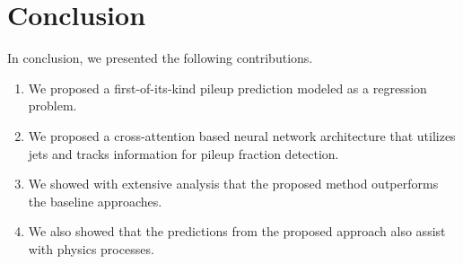 \section{Conclusion}\hfill

In conclusion, we presented the following contributions.
\begin{enumerate}
    \item We proposed a first-of-its-kind pileup prediction modeled as a regression problem.
    \item We proposed a cross-attention based neural network architecture that utilizes jets and tracks information for pileup fraction detection.
    \item We showed with extensive analysis that the proposed method outperforms the baseline approaches.
    \item We also showed that the predictions from the proposed approach also assist with physics processes.
\end{enumerate}